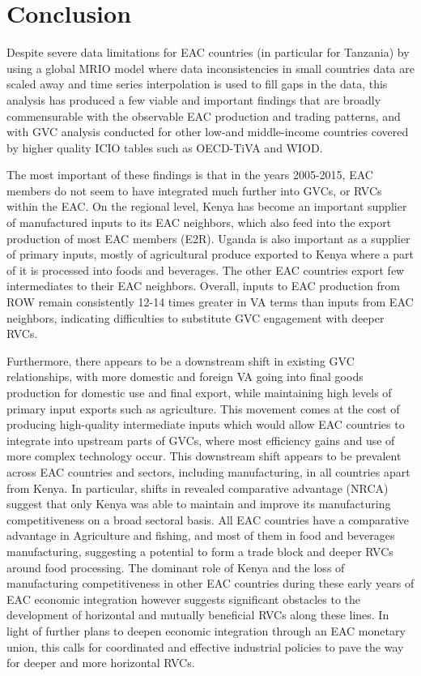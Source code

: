 \documentclass[a4paper]{article}
\begin{document}
\section{Conclusion} 

Despite severe data limitations for EAC countries (in particular for Tanzania) by using a global MRIO model where data inconsistencies in small countries data are scaled away and time series interpolation is used to fill gaps in the data, this analysis has produced a few viable and important findings that are broadly commensurable with the observable EAC production and trading patterns, and with GVC analysis conducted for other low-and middle-income countries covered by higher quality ICIO tables such as OECD-TiVA and WIOD. \newline

The most important of these findings is that in the years 2005-2015, EAC members do not seem to have integrated much further into GVCs, or RVCs within the EAC. On the regional level, Kenya has become an important supplier of manufactured inputs to its EAC neighbors, which also feed into the export production of most EAC members (E2R). Uganda is also important as a supplier of primary inputs, mostly of agricultural produce exported to Kenya where a part of it is processed into foods and beverages. The other EAC countries export few intermediates to their EAC neighbors. Overall, inputs to EAC production from ROW remain consistently 12-14 times greater in VA terms than inputs from EAC neighbors, indicating difficulties to substitute GVC engagement with deeper RVCs.  \newline

Furthermore, there appears to be a downstream shift in existing GVC relationships, with more domestic and foreign VA going into final goods production for domestic use and final export, while maintaining high levels of primary input exports such as agriculture. This movement comes at the cost of producing high-quality intermediate inputs which would allow EAC countries to integrate into upstream parts of GVCs, where most efficiency gains and use of more complex technology occur. This downstream shift appears to be prevalent across EAC countries and sectors, including manufacturing, in all countries apart from Kenya. In particular, shifts in revealed comparative advantage (NRCA) suggest that only Kenya was able to maintain and improve its manufacturing competitiveness on a broad sectoral basis. All EAC countries have a comparative advantage in Agriculture and fishing, and most of them in food and beverages manufacturing, suggesting a potential to form a trade block and deeper RVCs around food processing. The dominant role of Kenya and the loss of manufacturing competitiveness in other EAC countries during these early years of EAC economic integration however suggests significant obstacles to the development of horizontal and mutually beneficial RVCs along these lines. In light of further plans to deepen economic integration through an EAC monetary union, this calls for coordinated and effective industrial policies to pave the way for deeper and more horizontal RVCs. \newline 
\end{document}
